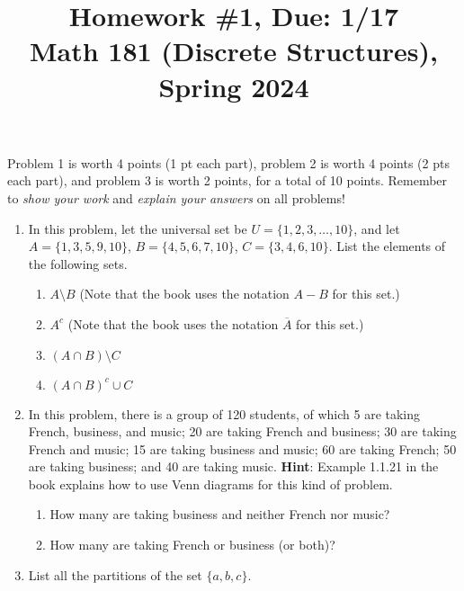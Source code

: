 \documentclass[11pt]{article}
\title{Homework \#1, Due: 1/17 \\Math 181 (Discrete Structures), Spring 2024}
\date{}
\begin{document}
\maketitle

\thispagestyle{empty}

\vspace{-1cm}

Problem 1 is worth 4 points (1 pt each part), problem 2 is worth 4 points (2 pts each part), and problem 3 is worth 2 points, for a total of 10 points. Remember to \emph{show your work} and \emph{explain your answers} on all problems!

\begin{enumerate}
\item In this problem, let the universal set be $U=\{1,2,3,\ldots,10\}$, and let $A=\{1,3,5,9,10\}$, $B=\{4,5,6,7,10\}$,  $C=\{3,4,6,10\}$. List the elements of the following sets.

\begin{enumerate}
\item $A \setminus B$ \hfill (Note that the book uses the notation $A-B$ for this set.)
\item $A^c$ \hfill (Note that the book uses the notation $\overline{A}$ for this set.)
\item $(A\cap B) \setminus C$
\item $(A \cap B)^c \cup C$
\end{enumerate}

\item In this problem, there is a group of 120 students, of which 5 are taking French, business, and music; 20 are taking French and business; 30 are taking French and music; 15 are taking business and music; 60 are taking French; 50 are taking business; and 40 are taking music. {\bf Hint}: Example 1.1.21 in the book explains how to use Venn diagrams for this kind of problem.

\begin{enumerate}
\item How many are taking business and neither French nor music?
\item How many are taking French or business (or both)?
\end{enumerate}

\item List all the partitions of the set $\{a,b,c\}$.

\end{enumerate}
\end{document}
